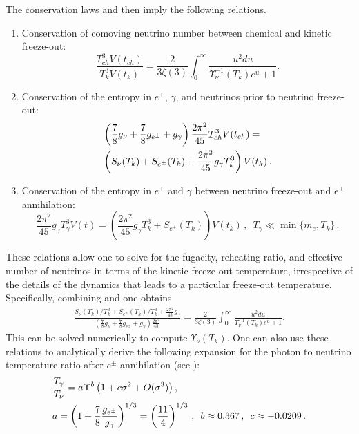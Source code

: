 The conservation laws  and  then imply the following  relations.
\begin{enumerate}
\item Conservation of comoving neutrino number between chemical and kinetic freeze-out:
\begin{equation}\label{eq_1}
\frac{T_{ch}^3V(t_{ch})}{T_k^3V(t_k)}=\frac{2}{3\zeta(3)}\int_0^\infty \frac{u^2 du}{\Upsilon_\nu^{-1}(T_k)e^u+1}.
\end{equation}
\item Conservation of the entropy in $e^\pm$, $\gamma$, and neutrinos prior to neutrino freeze-out:
\begin{align}\label{eq_2}
&\left(\frac{7}{8}g_\nu+\frac{7}{8}g_{e^\pm} +g_\gamma \right)\frac{2\pi^2}{45} T_{ch}^3V(t_{ch})=\\
&\left(S_{\nu}(T_k)+S_{e^\pm}(T_k)+\frac{2\pi^2}{45}g_\gamma T_k^3\right)V(t_k)\,.\notag
\end{align}
\item Conservation of the entropy in $e^\pm$ and $\gamma$ between neutrino freeze-out and $e^\pm$ annihilation:
\begin{equation}\label{eq_3}
\frac{2 \pi^2}{45}g_\gamma T_{\gamma}^3 V(t)=\left(\frac{2\pi^2}{45}g_\gamma T_k^3+S_{e^\pm}(T_k)\right)V(t_k)\,, \,\,\, T_\gamma\ll \min\{m_e, T_k\}\,.
\end{equation}
\end{enumerate}
These relations allow one to solve for the fugacity, reheating ratio, and effective number of neutrinos in terms of the kinetic freeze-out temperature, irrespective of the details of the dynamics that leads to a particular freeze-out temperature. Specifically, combining  and   one obtains
\begin{align}
   \frac{S_{\nu}(T_k)/T_k^3+S_{e^\pm}(T_k)/T_k^3+\frac{2\pi^2}{45}g_\gamma }{\left(\frac{7}{8}g_\nu+\frac{7}{8}g_{e^\pm} +g_\gamma \right)\frac{2\pi^2}{45} }=\frac{2}{3\zeta(3)}\int_0^\infty \frac{u^2 du}{\Upsilon_\nu^{-1}(T_k)e^u+1}.
\end{align}
This can be solved numerically to compute $\Upsilon_\nu(T_k)$. One can also use these relations to analytically derive the following expansion for the photon to neutrino temperature ratio after $e^\pm$ annihilation (see \cite{Birrell:2012gg}):
\begin{align}\label{Upsilon_ratio}
&\frac{T_\gamma}{T_\nu}=a\Upsilon^{b}\left(1+c\sigma^2+O(\sigma^3)\right),\\
\label{value_a}
&a=\left(1+\frac{7}{8}\frac{g_{e^\pm}}{g_\gamma}\right)^{1/3}=\left(\frac{11}{4}\right)^{1/3}\,,\,\,\,b\approx 0.367\,, \,\,\,c\approx -0.0209\,.\notag
\end{align}
